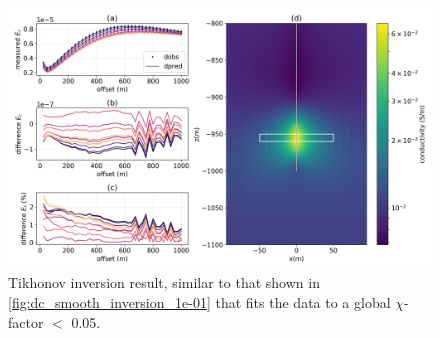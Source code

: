 \begin{figure}
    \begin{center}
    \includegraphics[width=1\textwidth]{figures/inversion/dc_smooth_inversion_5e-02.png}
    \end{center}
\caption{
    Tikhonov inversion result, similar to that shown in \ref{fig:dc_smooth_inversion_1e-01}
    that fits the data to a global $\chi$-factor $<$ 0.05.
}
\label{fig:dc_smooth_inversion_5e-02}
\end{figure}
